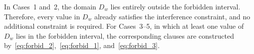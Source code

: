 \documentclass[letterpaper,journal]{IEEEtran}
\begin{document}
In Cases~1 and~2, the domain $D_w$ lies entirely outside the forbidden interval. Therefore, every value in $D_w$ already satisfies the interference constraint, and no additional constraint is required. 
For Cases~3--5, in which at least one value of $D_w$ lies in the forbidden interval, the corresponding clauses are constructed by~\eqref{eq:forbid_2},~\eqref{eq:forbid_1}, and~\eqref{eq:forbid_3}.
\end{document}
